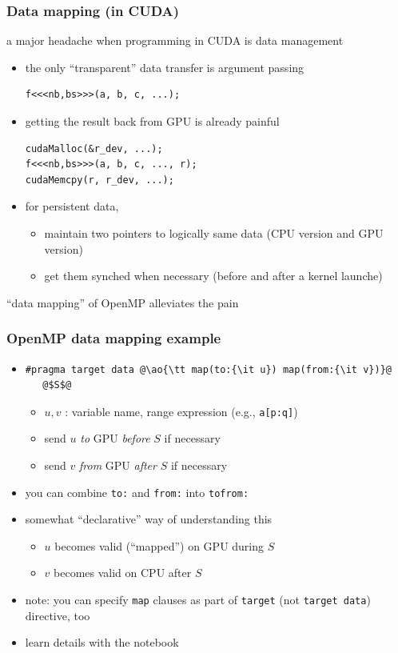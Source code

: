 \documentclass[12pt,dvipdfmx]{beamer}
\newcommand{\ao}[1]{{\color{blue}#1}}
\begin{document}
\begin{frame}[fragile]
  \frametitle{Data mapping (in CUDA)}
  a major headache when programming in CUDA is data management
  
  \begin{itemize}
  \item the only ``transparent'' data transfer is argument passing
\begin{lstlisting}
f<<<nb,bs>>>(a, b, c, ...);
\end{lstlisting}
  \item getting the result back from GPU is already painful
\begin{lstlisting}
cudaMalloc(&r_dev, ...);
f<<<nb,bs>>>(a, b, c, ..., r);
cudaMemcpy(r, r_dev, ...);
\end{lstlisting}
\item for persistent data,
  \begin{itemize}
  \item maintain two pointers to logically same data (CPU version and GPU version)
  \item get them synched when necessary (before and after a kernel launche)
  \end{itemize}
\end{itemize}

``data mapping'' of OpenMP alleviates the pain
\end{frame}

\begin{frame}[fragile]
  \frametitle{OpenMP data mapping example}
  \begin{itemize}
  \item 
\begin{lstlisting}
#pragma target data @\ao{\tt map(to:{\it u}) map(from:{\it v})}@
   @$S$@
\end{lstlisting}
\begin{itemize}
\item $u, v$ : variable name, range expression (e.g., {\tt a[p:q]})
\item send $u$ {\it to} GPU {\it before} $S$ if necessary
\item send $v$ {\it from} GPU {\it after} $S$ if necessary
\end{itemize}
\item you can combine \ao{\tt to:} and \ao{\tt from:} into \ao{\tt tofrom:}
\item somewhat ``declarative'' way of understanding this
  \begin{itemize}
  \item $u$ becomes valid (``mapped'') on GPU during $S$
  \item $v$ becomes valid on CPU after $S$
  \end{itemize}
\item note: you can specify {\tt map} clauses as part of
  {\tt target} (not {\tt target data}) directive, too
\item learn details with the notebook
\end{itemize}
\end{frame}
\end{document}
